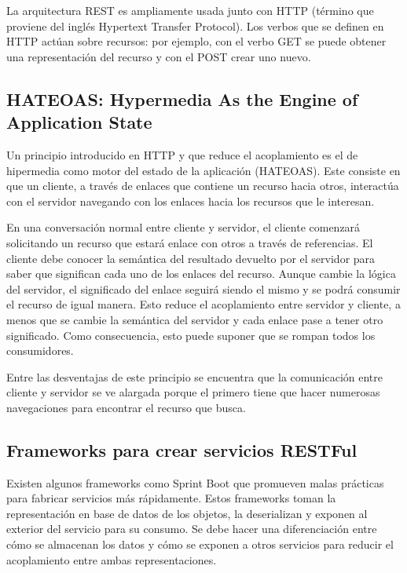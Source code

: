 \documentclass[11pt,a4paper]{article}
\begin{document}
La arquitectura REST es ampliamente usada junto con HTTP (término que proviene del inglés Hypertext Transfer Protocol). Los verbos que se definen en HTTP actúan sobre recursos: por ejemplo, con el verbo GET se puede obtener una representación del recurso y con el POST crear uno nuevo.

\subsection{HATEOAS: Hypermedia As the Engine of Application State}

Un principio introducido en HTTP y que reduce el acoplamiento es el de hipermedia como motor del estado de la aplicación (HATEOAS). Este consiste en que un cliente, a través de enlaces que contiene un recurso hacia otros, interactúa con el servidor navegando con los enlaces hacia los recursos que le interesan.

En una conversación normal entre cliente y servidor, el cliente comenzará solicitando un recurso que estará enlace con otros a través de referencias. El cliente debe conocer la semántica del resultado devuelto por el servidor para saber que significan cada uno de los enlaces del recurso. Aunque cambie la lógica del servidor, el significado del enlace seguirá siendo el mismo y se podrá consumir el recurso de igual manera. Esto reduce el acoplamiento entre servidor y cliente, a menos que se cambie la semántica del servidor y cada enlace pase a tener otro significado. Como consecuencia, esto puede suponer que se rompan todos los consumidores.

Entre las desventajas de este principio se encuentra que la comunicación entre cliente y servidor se ve alargada porque el primero tiene que hacer numerosas navegaciones para encontrar el recurso que busca.

\subsection{Frameworks para crear servicios RESTFul}

Existen algunos frameworks como Sprint Boot que promueven malas prácticas para fabricar servicios más rápidamente. Estos frameworks toman la representación en base de datos de los objetos, la deserializan y exponen al exterior del servicio para su consumo. Se debe hacer una diferenciación entre cómo se almacenan los datos y cómo se exponen a otros servicios para reducir el acoplamiento entre ambas representaciones.
\end{document}
